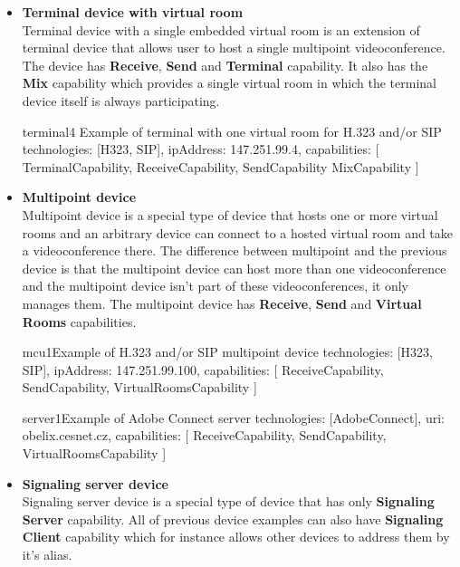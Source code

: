 \begin{itemize}
\item \textbf{Terminal device with virtual room} \\
  Terminal device with a single embedded virtual room is an extension of 
  terminal device that allows user to host a single multipoint 
  videoconference. The  device has \textbf{Receive}, \textbf{Send} and
  \textbf{Terminal} capability. It also has the \textbf{Mix} capability
  which provides a single virtual room in which the terminal device itself is 
  always participating.
  
\begin{EntityExample}{}{terminal4}%
      {Example of terminal with one virtual room for H.323 and/or SIP}
technologies: [H323, SIP],
ipAddress: 147.251.99.4,
capabilities: [
  TerminalCapability,
  ReceiveCapability,
  SendCapability
  MixCapability
]
\end{EntityExample}

\item \textbf{Multipoint device} \\
  Multipoint device is a special type of device that hosts one or more virtual 
  rooms and an arbitrary device can connect to a hosted virtual room and take 
  a videoconference there. The difference between multipoint and the previous 
  device is that the multipoint device can host more than one videoconference 
  and the multipoint device isn't part of these videoconferences, it only 
  manages them. The multipoint device has \textbf{Receive}, \textbf{Send}
  and \textbf{Virtual Rooms} capabilities.

\begin{EntityExample}{}{mcu1}{Example of H.323 and/or SIP multipoint device}
technologies: [H323, SIP],
ipAddress: 147.251.99.100,
capabilities: [
  ReceiveCapability,
  SendCapability,
  VirtualRoomsCapability
]
\end{EntityExample}

\begin{EntityExample}{}{server1}{Example of Adobe Connect server}
technologies: [AdobeConnect],
uri: obelix.cesnet.cz,
capabilities: [
  ReceiveCapability,
  SendCapability,
  VirtualRoomsCapability
]
\end{EntityExample}

\item \textbf{Signaling server device} \\
  Signaling server device is a special type of device that has only 
  \textbf{Signaling Server} capability. All of previous device examples can 
  also have \textbf{Signaling Client} capability which for instance allows 
  other devices to address them by it's alias.
    

\end{itemize}
